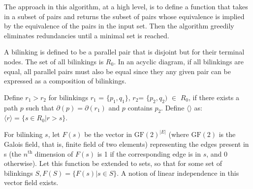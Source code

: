 \documentclass[sigplan,review]{acmart}
\begin{document}
The approach in this algorithm, at a high level, is to define a function that takes in a subset of pairs and returns the subset of pairs whose equivalence is implied by the equivalence of the pairs in the input set.
Then the algorithm greedily eliminates redundancies until a minimal set is reached.

A bilinking is defined to be a parallel pair that is disjoint but for their terminal nodes. The set of all bilinkings is $R_0$.
In an acyclic diagram, if all bilinkings are equal, all parallel pairs must also be equal since they any given pair can be expressed as a composition of bilinkings.

Define $r_1>r_2$ for bilinkings $r_1$ = $\{p_1,q_1\}$, $r_2$= $\{p_2, q_2)$ $\in$ $R_0$, if there exists a path $p$ such that $\partial(p) = \partial(r_1)$ and $p$ contains $p_2$.
Define $\langle\rangle$ as:
$\langle r \rangle = \{ s\in R_0| r>s\}$.

For bilinking $s$, let $F(s)$ be the vector in $\text{GF}(2)^{|E|}$ (where $\text{GF}(2)$ is the Galois field, that is, finite field of two elements) representing the edges present in s (the $n^{\text{th}}$ dimension of $F(s)$ is 1 if the corresponding edge is in $s$, and 0 otherwise).
Let this function be extended to sets, so that for some set of bilinkings $S, F(S) = \{ F(s) | s\in S \}$. A notion of linear independence in this vector field exists.
\end{document}
